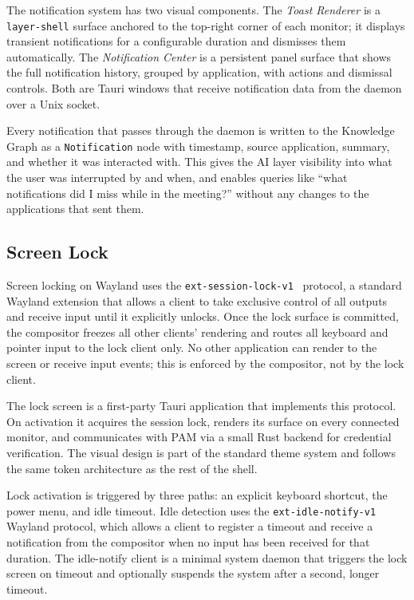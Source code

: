 The notification system has two visual components. The \emph{Toast Renderer}
is a \texttt{layer-shell} surface anchored to the top-right corner of each
monitor; it displays transient notifications for a configurable duration and
dismisses them automatically. The \emph{Notification Center} is a persistent
panel surface that shows the full notification history, grouped by application,
with actions and dismissal controls. Both are Tauri windows that receive
notification data from the daemon over a Unix socket.

Every notification that passes through the daemon is written to the Knowledge
Graph as a \texttt{Notification} node with timestamp, source application,
summary, and whether it was interacted with. This gives the AI layer visibility
into what the user was interrupted by and when, and enables queries like ``what
notifications did I miss while in the meeting?'' without any changes to the
applications that sent them.

\subsection{Screen Lock}
\label{sec:screenlock}

Screen locking on Wayland uses the
\texttt{ext-session-lock-v1}~\cite{ext:session-lock}
protocol, a standard Wayland extension that allows a client to take exclusive
control of all outputs and receive input until it explicitly unlocks. Once the
lock surface is committed, the compositor freezes all other clients' rendering
and routes all keyboard and pointer input to the lock client only. No other
application can render to the screen or receive input events; this is enforced
by the compositor, not by the lock client.

The lock screen is a first-party Tauri application that implements this
protocol. On activation it acquires the session lock, renders its surface on
every connected monitor, and communicates with PAM via a small Rust backend
for credential verification. The visual design is part of the standard theme
system and follows the same token architecture as the rest of the shell.

Lock activation is triggered by three paths: an explicit keyboard shortcut,
the power menu, and idle timeout. Idle detection uses the
\texttt{ext-idle-notify-v1} Wayland protocol, which allows a client to
register a timeout and receive a notification from the compositor when no
input has been received for that duration. The idle-notify client is a minimal
system daemon that triggers the lock screen on timeout and optionally suspends
the system after a second, longer timeout.


